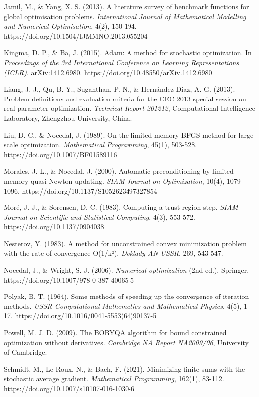 Jamil, M., \& Yang, X. S. (2013). A literature survey of benchmark functions for global optimisation problems.
\emph{International Journal of Mathematical Modelling and Numerical Optimisation}, 4(2),
150-194. https://doi.org/10.1504/IJMMNO.2013.055204

Kingma, D. P., \& Ba, J. (2015). Adam: A method for stochastic optimization. In \emph{Proceedings of the 3rd International
Conference on Learning Representations (ICLR)}. arXiv:1412.6980. https://doi.org/10.48550/arXiv.1412.6980

Liang, J. J., Qu, B. Y., Suganthan, P. N., \& Hernández-Díaz, A. G. (2013). Problem definitions and evaluation criteria
for the CEC 2013 special session on real-parameter optimization. \emph{Technical Report 201212}, Computational Intelligence
Laboratory, Zhengzhou University, China.

Liu, D. C., \& Nocedal, J. (1989). On the limited memory BFGS method for large scale optimization. \emph{Mathematical
Programming}, 45(1), 503-528. https://doi.org/10.1007/BF01589116

Morales, J. L., \& Nocedal, J. (2000). Automatic preconditioning by limited memory quasi-Newton updating. \emph{SIAM Journal
on Optimization}, 10(4), 1079-1096. https://doi.org/10.1137/S1052623497327854

Moré, J. J., \& Sorensen, D. C. (1983). Computing a trust region step. \emph{SIAM Journal on Scientific and Statistical
Computing}, 4(3), 553-572. https://doi.org/10.1137/0904038

Nesterov, Y. (1983). A method for unconstrained convex minimization problem with the rate of convergence O(1/k²).
\emph{Doklady AN USSR}, 269, 543-547.

Nocedal, J., \& Wright, S. J. (2006). \emph{Numerical optimization} (2nd ed.).
Springer. https://doi.org/10.1007/978-0-387-40065-5

Polyak, B. T. (1964). Some methods of speeding up the convergence of iteration methods. \emph{USSR Computational Mathematics
and Mathematical Physics}, 4(5), 1-17. https://doi.org/10.1016/0041-5553(64)90137-5

Powell, M. J. D. (2009). The BOBYQA algorithm for bound constrained optimization without derivatives. \emph{Cambridge NA
Report NA2009/06}, University of Cambridge.

Schmidt, M., Le Roux, N., \& Bach, F. (2021). Minimizing finite sums with the stochastic average gradient. \emph{Mathematical
Programming}, 162(1), 83-112. https://doi.org/10.1007/s10107-016-1030-6

